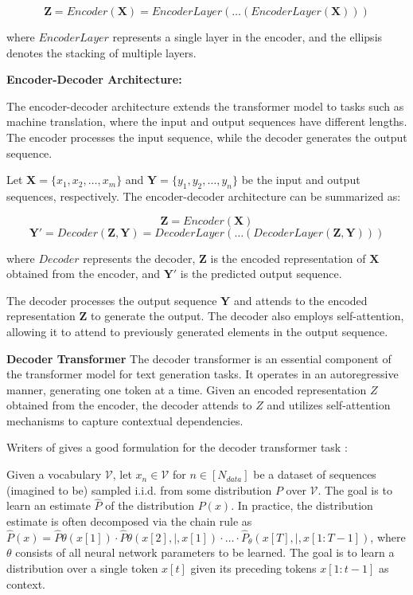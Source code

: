 \documentclass[a4paper,12pt]{article}
\begin{document}
$$\mathbf{Z} = Encoder(\mathbf{X}) = EncoderLayer(\ldots(EncoderLayer(\mathbf{X})))$$

where $EncoderLayer$ represents a single layer in the encoder, and the ellipsis denotes the stacking of multiple layers.

\textbf{Encoder-Decoder Architecture:}

The encoder-decoder architecture extends the transformer model to tasks such as machine translation, where the input and output sequences have different lengths. The encoder processes the input sequence, while the decoder generates the output sequence.

Let $\mathbf{X} = \{x_1, x_2, \ldots, x_m\}$ and $\mathbf{Y} = \{y_1, y_2, \ldots, y_n\}$ be the input and output sequences, respectively. The encoder-decoder architecture can be summarized as:

$$\mathbf{Z} = Encoder(\mathbf{X})$$
$$\mathbf{Y'} = Decoder(\mathbf{Z}, \mathbf{Y}) = DecoderLayer(\ldots(DecoderLayer(\mathbf{Z}, \mathbf{Y})))$$

where $Decoder$ represents the decoder, $\mathbf{Z}$ is the encoded representation of $\mathbf{X}$ obtained from the encoder, and $\mathbf{Y'}$ is the predicted output sequence.

The decoder processes the output sequence $\mathbf{Y}$ and attends to the encoded representation $\mathbf{Z}$ to generate the output. The decoder also employs self-attention, allowing it to attend to previously generated elements in the output sequence.

\textbf{Decoder Transformer}
The decoder transformer is an essential component of the transformer model for text generation tasks. It operates in an autoregressive manner, generating one token at a time. Given an encoded representation $Z$ obtained from the encoder, 
the decoder attends to $Z$ and utilizes self-attention mechanisms to capture contextual dependencies.

Writers of \cite{formaltransformer} gives a good formulation for the decoder transformer task : 

Given a vocabulary $\mathcal{V}$, let $x_n \in \mathcal{V}$ for $n \in [N_{data}]$ be a dataset of sequences (imagined to be) sampled i.i.d. from some distribution $P$ over $\mathcal{V}$. 
The goal is to learn an estimate $\hat{P}$ of the distribution $P(x)$. 
In practice, the distribution estimate is often decomposed via the chain rule as $\hat{P}(x) = \hat{P}{\theta}(x[1]) \cdot \hat{P}{\theta}(x[2] ,|, x[1]) \cdot \ldots \cdot \hat{P}_{\theta}(x[T] ,|, x[1:T-1])$, 
where $\theta$ consists of all neural network parameters to be learned. 
The goal is to learn a distribution over a single token $x[t]$ given its preceding tokens $x[1:t-1]$ as context.
\end{document}
